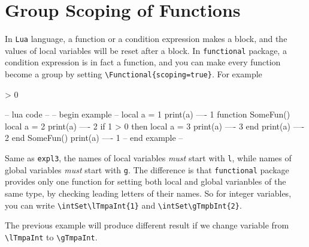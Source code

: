 \documentclass[oneside]{book}
\begin{document}

\section{Group Scoping of Functions}

In \verb!Lua! language, a function or a condition expression makes a block,
and the values of local variables will be reset after a block.
In \verb!functional! package, a condition expression is in fact a function,
and you can make every function become a group by setting
\verb!\Functional{scoping=true}!. For example

\begin{minipage}{0.58\textwidth}
\begin{codehigh}
\IgnoreSpacesOn
\intSet {}
\intVarLog \lTmpaInt            %
\prgNewFunction \someFun { } {
  \intSet {}
  \intVarLog \lTmpaInt          %
   > {0} {
    \intSet {}
    \intVarLog \lTmpaInt        %
  }{ }
  \intVarLog \lTmpaInt          %
}
\someFun
\intVarLog \lTmpaInt            %
\IgnoreSpacesOff
\end{codehigh}
\end{minipage}%
\begin{minipage}{0.42\textwidth}
\begin{code}
-- lua code --
-- begin example --
local a = 1
print(a)            ---- 1
function SomeFun()
  local a = 2
  print(a)          ---- 2
  if 1 > 0 then
    local a = 3
    print(a)        ---- 3
  end
  print(a)          ---- 2
end
SomeFun()
print(a)            ---- 1
-- end example --
\end{code}
\end{minipage}

Same as \verb!expl3!, the names of local variables \emph{must} start with \verb!l!,
while names of global variables \emph{must} start with \verb!g!.
The difference is that \verb!functional! package provides only one function for setting
both local and global varianbles of the same type,
by checking leading letters of their names. So for integer variables, you can write
\verb!\intSet\lTmpaInt{1}! and \verb!\intSet\gTmpbInt{2}!.

The previous example will produce different result
if we change variable from \verb!\lTmpaInt! to \verb!\gTmpaInt!.
\end{document}
